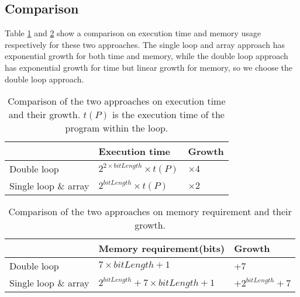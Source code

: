 \subsection{Comparison}
Table \ref{tbl:execTime} and \ref{tbl:memReq} show a comparison on execution time and memory usage respectively for these two approaches. The single loop and array approach has exponential growth for both time and memory, while the double loop approach has exponential growth for time but linear growth for memory, so we choose the double loop approach. 

\begin{table}
\begin{tabular}{|l|l|l|}
\hline
 & Execution time & Growth  \\ \hline
Double loop & $2^{2 \times bitLength} \times t(P)$ & $\times 4$  \\ \hline
Single loop \& array & $2^{bitLength} \times t(P)$ & $\times 2$		\\ \hline
\end{tabular}
\caption{Comparison of the two approaches on execution time and their growth. $t(P)$ is the execution time of the program within the loop.}
\label{tbl:execTime}
\end{table}


\begin{table}
\begin{tabular}{|l|l|l|}
\hline
 & Memory requirement(bits) & Growth \\ \hline
Double loop & $7 \times bitLength + 1$ & +7 \\ \hline
Single loop \& array & $2^{bitLength} + 7 \times bitLength + 1$ & $+ 2^{bitLength} + 7$ \\ \hline
\end{tabular}
\caption{Comparison of the two approaches on memory requirement and their growth.}
\label{tbl:memReq}
\end{table}
